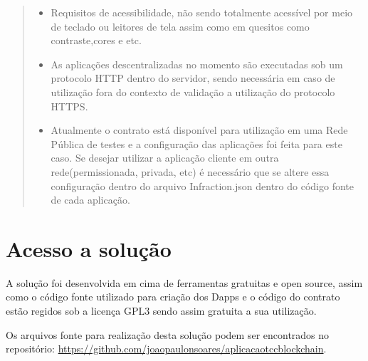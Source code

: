     \begin{quote}
        \begin{itemize}
            \item Requisitos de acessibilidade, não sendo totalmente acessível por meio de teclado ou leitores de tela assim como em quesitos como contraste,cores e etc.
            \item As aplicações descentralizadas no momento são executadas sob um protocolo HTTP dentro do servidor, sendo necessária em caso de utilização fora do contexto de validação a utilização do protocolo HTTPS.
             \item Atualmente o contrato está disponível para utilização em uma Rede Pública de testes e a configuração das aplicações foi feita para este caso. Se desejar utilizar a aplicação cliente em outra rede(permissionada, privada, etc) é necessário que se altere essa configuração dentro do arquivo Infraction.json dentro do código fonte de cada aplicação.
        \end{itemize}
    \end{quote}
    

\section{Acesso a solução}

A solução foi desenvolvida em cima de ferramentas gratuitas e open source, assim como o código fonte utilizado para criação dos Dapps e o código do contrato estão regidos sob a licença GPL3 sendo assim gratuita a sua utilização.

Os arquivos fonte para realização desta solução podem ser encontrados no repositório:  \url{https://github.com/joaopaulonsoares/aplicacaotccblockchain}.

